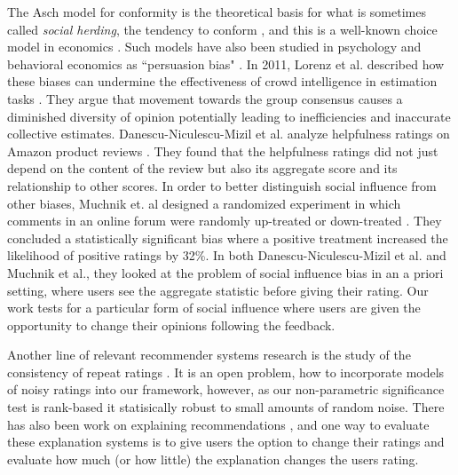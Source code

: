 The Asch model for conformity is the theoretical basis for what is sometimes called \emph{social herding}, the tendency to conform \cite{banerjee1992simple,bikhchandani2000herd}, and this is a well-known choice model in economics \cite{burnkrant1975informational,dholakia2002auction,huang2006herding}. 
Such models have also been studied in psychology and behavioral economics as ``persuasion bias" \cite{demarzo2003persuasion, hong2004social, golub2010naive, dellavigna2009persuasion}.
In 2011, Lorenz et al. described how these biases can undermine the effectiveness of crowd intelligence in estimation tasks \cite{lorenz2011social}. 
They argue that movement towards the group consensus causes a diminished diversity of opinion potentially leading to inefficiencies and inaccurate collective estimates.
Danescu-Niculescu-Mizil et al. analyze helpfulness ratings on Amazon product reviews \cite{danescu2009opinions}.
They found that the helpfulness ratings did not just depend on the content of the review but also its aggregate score and its relationship to other scores.
In order to better distinguish social influence from other biases, Muchnik et. al designed a randomized experiment in which comments in an online forum were randomly up-treated or down-treated \cite{muchnik2013social}.
They concluded a statistically significant bias where a positive treatment increased the likelihood of positive ratings by 32\%. 
In both Danescu-Niculescu-Mizil et al. and Muchnik et al., they looked at the problem of social influence bias in an a priori setting, where users see the aggregate statistic before giving their rating.
Our work tests for a particular form of social influence where users are given the opportunity to change their opinions following the feedback. 

Another line of relevant recommender systems research is the study of the consistency of repeat ratings \cite{amatriain2009rate, amatriain2009like}.
It is an open problem, how to incorporate models of noisy ratings into our framework, however, as our non-parametric significance test is rank-based it statisically robust to small amounts of random noise.
There has also been work on explaining recommendations \cite{bilgic2005explaining, tintarev2007survey}, and one way to evaluate these explanation systems is to give users the option to change their ratings and evaluate how much (or how little) the explanation changes the users rating.

